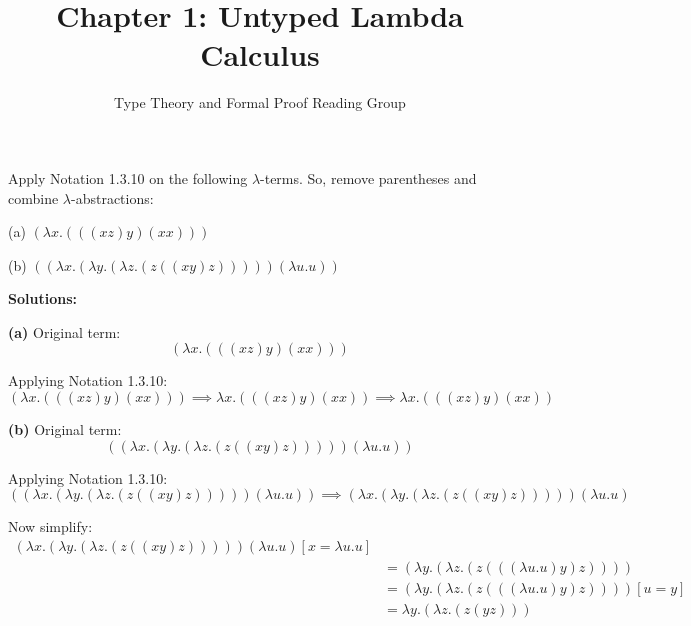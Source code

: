 \documentclass[12pt]{article}
\title{Chapter 1: Untyped Lambda Calculus}
\author{Type Theory and Formal Proof Reading Group}
\date{}
\begin{document}
 Apply Notation 1.3.10 on the following $\lambda$-terms. So, remove parentheses and combine $\lambda$-abstractions:

(a) $(\lambda x . (((x z) y) (x x)))$

(b) $((\lambda x . (\lambda y . (\lambda z . (z ((x y) z))))) (\lambda u . u))$

\vspace{1em}


\textbf{Solutions:}

\textbf{(a)}
Original term:
\[
(\lambda x . (((x z) y) (x x)))
\]

Applying Notation 1.3.10:
\[
(\lambda x . (((x z) y) (x x))) \implies \lambda x . (((x z) y) (x x)) \implies \lambda x . (((x z) y) (x x))
\]

\textbf{(b)}
Original term:
\[
((\lambda x . (\lambda y . (\lambda z . (z ((x y) z))))) (\lambda u . u))
\]

Applying Notation 1.3.10:
\[
((\lambda x . (\lambda y . (\lambda z . (z ((x y) z))))) (\lambda u . u)) \implies
(\lambda x . (\lambda y . (\lambda z . (z ((x y) z))))) (\lambda u . u)
\]

Now simplify:\\
\begin{align*}
   (\lambda x . (\lambda y . (\lambda z . (z ((x y) z))))) (\lambda u . u) [x = \lambda u . u] \\
   &= (\lambda y . (\lambda z . (z (((\lambda u . u) y) z)))) \\
   &= (\lambda y . (\lambda z . (z (((\lambda u . u) y) z)))) [u = y] \\
   &= \lambda y . (\lambda z . (z (y z)))
\end{align*}
\end{document}
